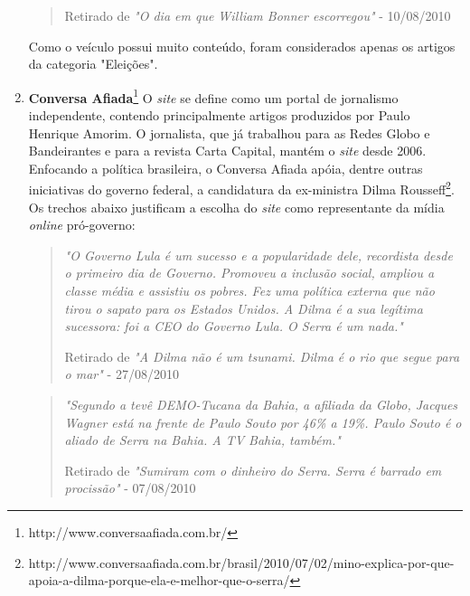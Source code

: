 \begin{enumerate}
\begin{quote}
{ \small Retirado de \emph{"O dia em que William Bonner escorregou"} - 10/08/2010}

\end{quote}


Como o veículo possui muito conteúdo, foram considerados apenas os artigos da categoria "Eleições".  

\item \textbf{Conversa Afiada}\footnote{http://www.conversaafiada.com.br/} O \emph{site} se define como um portal de jornalismo independente, contendo principalmente artigos produzidos por Paulo Henrique Amorim. O jornalista, que já trabalhou para as Redes Globo e Bandeirantes e para a revista Carta Capital, mantém o \emph{site} desde 2006. Enfocando a política brasileira, o Conversa Afiada apóia, dentre outras iniciativas do governo federal, a candidatura da ex-ministra Dilma Rousseff\footnote{http://www.conversaafiada.com.br/brasil/2010/07/02/mino-explica-por-que-apoia-a-dilma-porque-ela-e-melhor-que-o-serra/}. Os trechos abaixo justificam a escolha do \emph{site} como representante da mídia \emph{online} pró-governo:

\begin{quote}

\emph{"O Governo Lula é um sucesso e a popularidade dele, recordista desde o primeiro dia de Governo. Promoveu a inclusão social, ampliou a classe média e assistiu os pobres. Fez uma política externa que não tirou o sapato para os Estados Unidos. A Dilma é a sua legítima sucessora: foi a CEO do Governo Lula. O Serra é um nada."}

{\small Retirado de \emph{"A Dilma não é um tsunami. Dilma é o rio que segue para o mar"} - 27/08/2010}
\end{quote}

\begin{quote}

\emph{"Segundo a tevê DEMO-Tucana da Bahia, a afiliada da Globo, Jacques Wagner está na frente de Paulo Souto por 46\% a 19\%. Paulo Souto é o aliado de Serra na Bahia. A TV Bahia, também."}

{\small Retirado de \emph{"Sumiram com o dinheiro do Serra. Serra é barrado em procissão"} - 07/08/2010}
\end{quote}



\end{enumerate}

